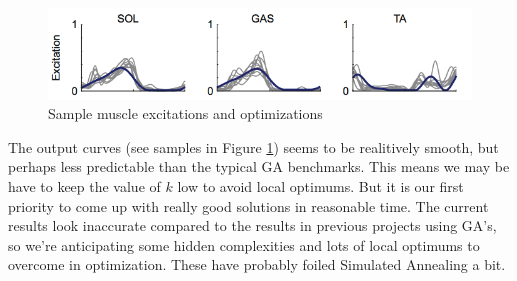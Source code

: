 \begin{figure}[!h]
        \begin{center}
		\includegraphics[width=120mm]{images/excite}
               \caption{Sample muscle excitations and optimizations \cite{mcgowan}}
                \label{curves}
        \end{center}
\end{figure}

The output curves (see samples in Figure \ref{curves}) seems to be 
realitively smooth, but perhaps less predictable than the typical GA benchmarks.
This means we may be have to keep the value of $ k $ low to avoid local 
optimums. But it is our first priority to come up with really good 
solutions in reasonable time. The current results look inaccurate 
compared to the results in previous projects using GA's, so we're anticipating
some hidden complexities and lots of local optimums to overcome in optimization.
These have probably foiled Simulated Annealing a bit.

